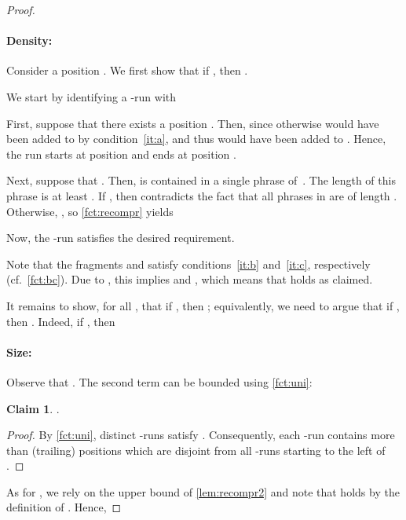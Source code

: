 \documentclass[a4paper]{article}
\theoremstyle{definition}
\newtheorem{claim}[theorem]{Claim}
\theoremstyle{remark}
\begin{document}
\begin{proof}
\paragraph*{\bf Density:}
Consider a position .
We first show that if , then .

We start by identifying  a -run  with

First, suppose that there exists a position .
Then,  since otherwise  would have been added to  by condition~\ref{it:a},
and thus  would have been added to .
Hence, the run  starts at position  and ends at position .

Next, suppose that .
Then,  is contained in a single phrase of~.
The length of this phrase is at least .
If , then  contradicts the fact that all phrases in  are of length .
Otherwise, , so \cref{fct:recompr} yields 

Now, the -run  satisfies the desired requirement.

Note that the fragments  and  satisfy conditions~\ref{it:b} and~\ref{it:c}, respectively (cf.\ \cref{fct:bc}).
Due to , this implies  and ,
which means that  holds as claimed.

\medskip
It remains to show, for all , that
if , then ;
equivalently, we need to argue that if , then .
Indeed, if ,
then  

\paragraph*{\bf Size:}
Observe that . 
The second term can be bounded using \cref{fct:uni}:
\begin{claim}
  .
\end{claim}
\begin{proof}
  By \cref{fct:uni}, distinct -runs  satisfy .
  Consequently, each -run  contains more than 
  (trailing) positions which are disjoint from all -runs starting to the left of .
\end{proof}
As for , we rely on the upper bound of \cref{lem:recompr2}
and note that  holds by the definition of .
Hence,

\end{proof}
\end{document}
